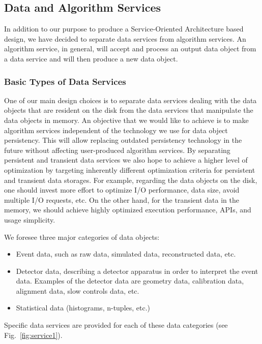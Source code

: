 \subsection{Data and Algorithm Services}

In addition to our purpose to produce a Service-Oriented Architecture based 
design, we have decided to separate data services from algorithm services. 
An algorithm service, in general, will accept and process an output data 
object from a data service and will then produce a new data object.

\subsubsection{Basic Types of Data Services}

One of our main design choices is to separate data services dealing with the 
data objects that are resident on the disk from the data services that 
manipulate the data objects in memory.  An objective that we would like 
to achieve is to make algorithm services independent of the technology we 
use for data object persistency. This will allow replacing outdated 
persistency technology in the future without affecting user-produced 
algorithm services. By separating persistent and transient data services we 
also hope to achieve a higher level of optimization by targeting inherently 
different optimization criteria for persistent and transient data storages. 
For example, regarding the data objects on the disk, one should invest more 
effort to optimize I/O performance, data size, avoid multiple I/O requests, 
etc. On the other hand, for the transient data in the memory, we should 
achieve highly optimized execution performance, APIs, and usage simplicity.

We foresee three major categories of data objects:

\begin{itemize}
\item Event data, such as raw data, simulated data, reconstructed data, etc.
\item Detector data, describing a detector apparatus in order to interpret 
the event data. Examples of the detector data are geometry data, calibration 
data, alignment data, slow controls data, etc.
\item Statistical data (histograms, n-tuples, etc.)
\end{itemize}

Specific data services are provided for each of these data categories (see 
Fig.~\ref{fig:service1}).

